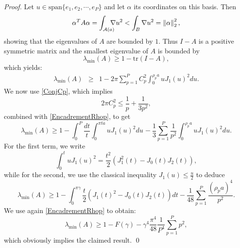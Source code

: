 \documentclass[smallextended]{svjour3}
\begin{document}
\begin{proof}
	Let $u \in \text{span}\{e_1,e_2,\cdots,e_P\}$ and let $\alpha$ its coordinates on this basis. Then 
	\[\alpha^T A \alpha = \int_{\mathcal{A}(a)} \!\!\!\!\! \nabla{u}^2 < \int_{B} \nabla{u}^2 = \left\|\alpha\right\|_2^2,\]
	showing that the eigenvalues of $A$ are bounded by $1$. Thus $I-A$ is a positive symmetric matrix and the smallest eigenvalue of $A$ is bounded by
	\[\lambda_{\min}(A) \geq 1 - \text{tr}(I - A),\]
	which yields:
	\begin{eqnarray*}
		\lambda_{\min}(A) &\geq& 1 - 2\pi \sum_{p=1}^{P}C_p^2\int_{0}^{\rho_p a} u J_1(u)^2 du.
	\end{eqnarray*}
	We now use  \autoref{ConjCp}, which implies
	\[2\pi C_p^2 \leq \dfrac{1}{p} + \dfrac{1}{3p^2},\]
	combined with \eqref{EncadrementRhop}, to get
	\[\lambda_{\min}(A) \geq 1 - \int_{0}^{P} \frac{dt}{t} \int_{0}^{\pi t a} u J_1(u)^2du \hspace{1pt} - \frac{1}{3}\sum_{p=1}^P \frac{1}{p^2} \int_{0}^{\rho_p a} u J_1(u)^2du.\]
	For the first term, we write 
	\[\int_0^t u J_1(u)^2 = \frac{t^2}{2} \left(J_1^2(t) - J_0(t)J_2(t)\right),\] 
	while for the second, we use the classical inequality $J_1(u) \leq \frac{u}{2}$ to deduce
	\[\lambda_{\min}(A) \geq 1 - \int_{0}^{\pi\gamma} \dfrac{t}{2} \left(J_1(t)^2 - J_0(t)J_2(t)\right)dt - \frac{1}{48} \sum_{p=1}^P \frac{(\rho_p a)^4}{p^2}.\]
	We use again \eqref{EncadrementRhop} to obtain:
	\[\lambda_{\min}(A) \geq 1 - F(\gamma) - \gamma^4\frac{\pi^4}{48} \frac{1}{P^4} \sum_{p=1}^P p^2,\]
	which obviously implies the claimed result. 
	\qed
\end{proof}
\end{document}
